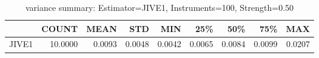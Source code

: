 \begin{table}[ht]
\centering
\caption{variance summary: Estimator=JIVE1, Instruments=100, Strength=0.50}
\begin{tabular}{lrrrrrrrr}
\toprule
 & COUNT & MEAN & STD & MIN & 25\% & 50\% & 75\% & MAX \\
\midrule
JIVE1 & 10.0000 & 0.0093 & 0.0048 & 0.0042 & 0.0065 & 0.0084 & 0.0099 & 0.0207 \\
\bottomrule
\end{tabular}
\end{table}
